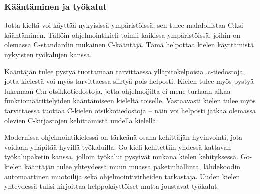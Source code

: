 \subsubsection{Kääntäminen ja työkalut}

Jotta kieltä voi käyttää nykyisissä ympäristöissä, sen tulee mahdollistaa C:ksi
kääntäminen. Tällöin ohjelmointikieli toimii kaikissa ympäristöissä, joihin on
olemassa C-standardin mukainen C-kääntäjä. Tämä helpottaa kielen käyttämistä
nykyisten työkalujen kanssa.



Kääntäjän tulee pystyä tuottamaan tarvittaessa ylläpitokelpoisia .c-tiedostoja,
jotta kielestä voi myös tarvittaessa siirtyä pois helposti.  Kielen tulee myös
pystyä lukemaan C:n otsikkotiedostoja, jotta ohjelmoijilta ei mene turhaan
aikaa funktiomäärittelyiden kääntämiseen kieleltä toiselle. Vastaavasti kielen
tulee myös tarvittaessa tuottaa C-kielen otsikkotiedostoja -- näin voi helposti
jatkaa olemassa olevien C-kirjastojen kehittämistä uudella kielellä.

%

Modernissa ohjelmointikielessä on tärkeänä osana kehittäjän hyvinvointi, jota
voidaan ylläpitää hyvillä työkaluilla. Go-kieli kehitettiin yhdessä kattavan
työkalupaketin kanssa, jolloin työkalut pysyivät mukana kielen kehityksessä.
Go-kielen kääntäjän tulee yhteydessä muun muassa paketinhallinta, lähdekoodin
automaattinen muotoilija sekä ohjelmointivirheiden tarkastaja. Uuden kielen
yhteydessä tulisi kirjoittaa helppokäyttöiset mutta joustavat työkalut.



